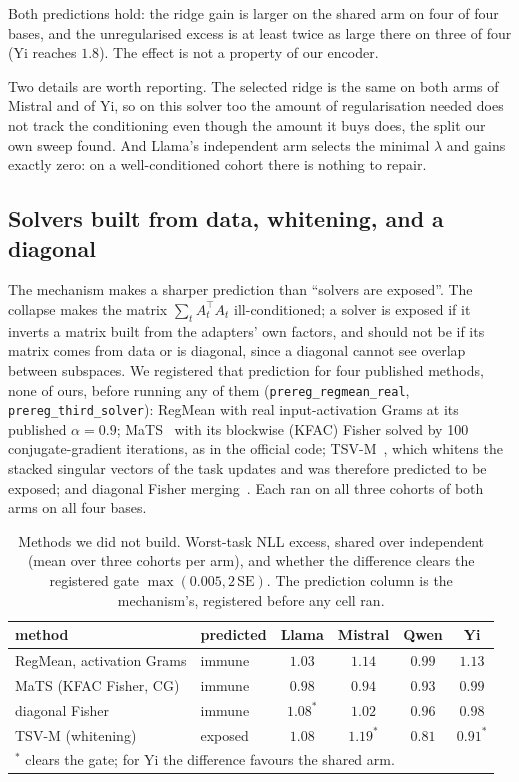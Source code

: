 Both predictions hold: the ridge gain is larger on the shared arm on four of
four bases, and the unregularised excess is at least twice as large there on
three of four (Yi reaches $1.8$). The effect is not a property of our encoder.

Two details are worth reporting. The selected ridge is the same on both arms
of Mistral and of Yi, so on this solver too the amount of regularisation
needed does not track the conditioning even though the amount it buys does,
the split our own sweep found. And Llama's independent arm selects the minimal
$\lambda$ and gains exactly zero: on a well-conditioned cohort there is nothing
to repair.

\subsection{Solvers built from data, whitening, and a diagonal}
\label{subsec:data-solvers}

The mechanism makes a sharper prediction than ``solvers are exposed''. The
collapse makes the matrix $\sum_t A_t^\top A_t$ ill-conditioned; a solver is
exposed if it inverts a matrix built from the adapters' own factors, and should
not be if its matrix comes from data or is diagonal, since a diagonal cannot see
overlap between subspaces. We registered that prediction for four published
methods, none of ours, before running any of them
(\texttt{prereg\_regmean\_real}, \texttt{prereg\_third\_solver}): RegMean with
real input-activation Grams at its published $\alpha = 0.9$; MaTS~\citep{tam2024mats}
with its blockwise (KFAC) Fisher solved by 100 conjugate-gradient iterations,
as in the official code; TSV-M~\citep{gargiulo2025tsv}, which whitens the
stacked singular vectors of the task updates and was therefore predicted to be
exposed; and diagonal Fisher merging~\citep{matena2022fisher}. Each ran on all
three cohorts of both arms on all four bases.

\begin{table}[t]
\centering
\small
\caption{Methods we did not build. Worst-task NLL excess, shared over
independent (mean over three cohorts per arm), and whether the difference
clears the registered gate $\max(0.005, 2\,\mathrm{SE})$. The prediction column
is the mechanism's, registered before any cell ran.}
\label{tab:data-solvers}
\begin{tabular}{llcccc}
\toprule
method & predicted & Llama & Mistral & Qwen & Yi \\
\midrule
RegMean, activation Grams & immune & $1.03$ & $1.14$ & $0.99$ & $1.13$ \\
MaTS (KFAC Fisher, CG)    & immune & $0.98$ & $0.94$ & $0.93$ & $0.99$ \\
diagonal Fisher           & immune & $1.08^{\ast}$ & $1.02$ & $0.96$ & $0.98$ \\
TSV-M (whitening)         & exposed & $1.08$ & $1.19^{\ast}$ & $0.81$ & $0.91^{\ast}$ \\
\bottomrule
\multicolumn{6}{l}{\footnotesize $^{\ast}$ clears the gate; for Yi the
difference favours the shared arm.}
\end{tabular}
\end{table}

